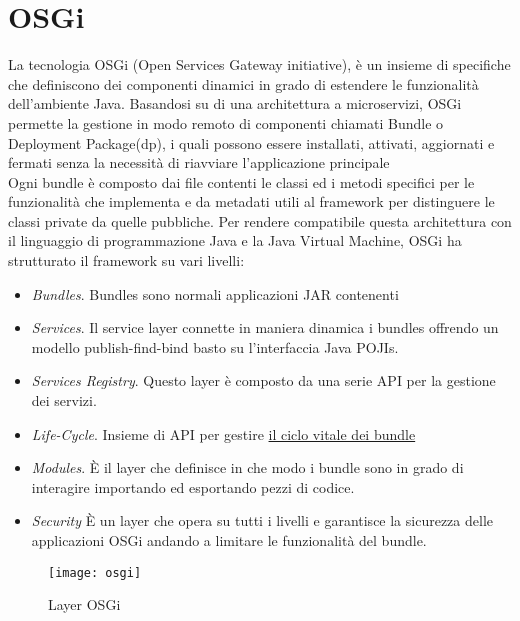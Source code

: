 \section{OSGi}
La tecnologia OSGi (Open Services Gateway initiative),
è un insieme di specifiche che definiscono dei componenti
dinamici in grado di estendere le funzionalità dell'ambiente  Java.
Basandosi su di una architettura a microservizi, OSGi permette la gestione in
modo remoto di componenti chiamati Bundle o Deployment Package(dp), i quali
possono essere installati, attivati, aggiornati e fermati senza la necessità di
riavviare l'applicazione principale\\
Ogni bundle è composto dai file contenti le classi ed i metodi specifici per le
funzionalità che implementa e da  metadati utili al framework
per distinguere le classi private da quelle pubbliche. 
Per rendere compatibile questa architettura con il linguaggio di programmazione
Java e la Java Virtual Machine, OSGi ha strutturato il framework su vari
livelli:
\begin{itemize}
        \item   \textit{Bundles}. Bundles sono normali applicazioni JAR contenenti
        \item   \textit{Services}. Il service layer connette in maniera dinamica
                i bundles offrendo un modello publish-find-bind basto su
                l'interfaccia Java POJIs.
        \item   \textit{Services Registry}. Questo layer è composto da una serie
                 API per la gestione dei servizi.
        \item   \textit{Life-Cycle}. Insieme di API per gestire \hyperlink{cycle_bundle}{il ciclo vitale
                dei bundle}
        \item   \textit{Modules}. È il layer che definisce in che modo i bundle
                sono in grado di interagire importando ed esportando pezzi di
                codice.
        \item   \textit{Security} È un layer che opera su tutti i livelli e
                garantisce la sicurezza delle applicazioni OSGi andando a
                limitare le funzionalità del bundle.
\end{itemize}
\begin{figure}[th]
\centering 
\texttt{[image: osgi]}
\caption{Layer OSGi}
\label{}
\end{figure}

